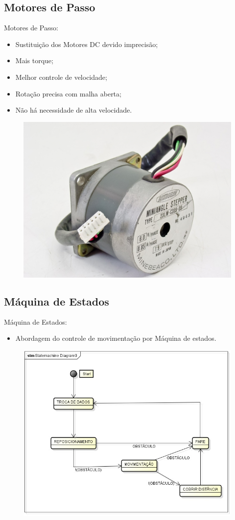 \documentclass{beamer}
\begin{document}
\subsection{Motores de Passo}
\begin{frame}
  Motores de Passo:
        \begin{itemize}
            \item Sustituição dos Motores DC devido imprecisão;
            \item Mais torque;
            \item Melhor controle de velocidade;
            \item Rotação precisa com malha aberta;
            \item Não há necessidade de alta velocidade.
        \end{itemize}
    \begin{figure}
    \centering
    \includegraphics[width=0.4\linewidth]{eletronica_1}
  \end{figure}
\end{frame}

\subsection{Máquina de Estados}
\begin{frame}
  Máquina de Estados:
        \begin{itemize}
            \item Abordagem do controle de movimentação por Máquina de estados.
        \end{itemize}
    \begin{figure}
    \centering
    \includegraphics[width=0.63\linewidth]{eletronica_2}
  \end{figure}
\end{frame}
\end{document}
